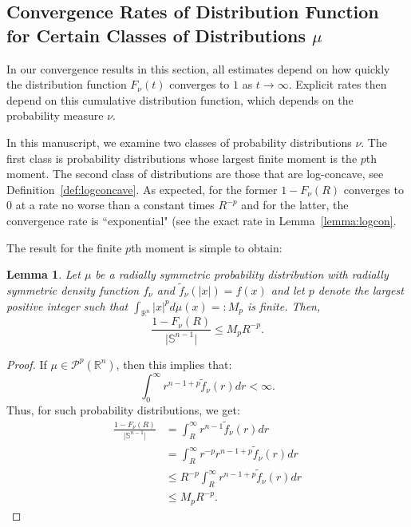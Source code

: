 \documentclass{amsart}
\theoremstyle{lemma}
\newtheorem{lemma}[theorem]{Lemma}
\theoremstyle{remark}
\begin{document}
\subsection{Convergence Rates of Distribution Function for Certain Classes of Distributions $\mu$}\label{sec:radialdistributions}

In our convergence results in this section, all estimates depend on how quickly the distribution function $F_{\nu}(t)$ converges to $1$ as $t \rightarrow \infty$. Explicit rates then depend on this cumulative distribution function, which depends on the probability measure $\nu$. 

In this manuscript, we examine two classes of probability distributions $\nu$. The first class is probability distributions whose largest finite moment is the $p$th moment. The second class of distributions are those that are log-concave, see Definition~\ref{def:logconcave}. As expected, for the former $1 - F_{\nu}(R)$ converges to $0$ at a rate no worse than a constant times $R^{-p}$ and for the latter, the convergence rate is ``exponential" (see the exact rate in Lemma~\ref{lemma:logcon}.

The result for the finite $p$th moment is simple to obtain:

\begin{lemma}\label{lemma:pmoment}
Let $\mu$ be a radially symmetric probability distribution with radially symmetric density function $f_{\nu}$ and $\tilde{f}_{\nu}(\vert x \vert) = f(x)$ and let $p$ denote the largest positive integer such that $\int_{\mathbb{R}^n} \vert x \vert^{p} d\mu(x) =: M_p$ is finite. Then,
\begin{equation}
\frac{1-F_{\nu}(R)}{\vert \mathbb{S}^{n-1} \vert} \leq M_p R^{-p}.
\end{equation}
\end{lemma}

\begin{proof}
If $\mu \in \mathcal{P}^{p}(\mathbb{R}^{n})$, then this implies that:
\begin{equation}
\int_{0}^{\infty} r^{n-1+p} \tilde{f}_{\nu}(r) dr < \infty.
\end{equation}
Thus, for such probability distributions, we get:
\begin{align}
\frac{1-F_{\nu}(R)}{\vert \mathbb{S}^{n-1} \vert} &= \int_{R}^{\infty} r^{n-1} \tilde{f}_{\nu}(r)dr \\
&= \int_{R}^{\infty} r^{-p} r^{n-1+p} \tilde{f}_{\nu}(r)dr \\
&\leq R^{-p} \int_{R}^{\infty} r^{n-1+p} \tilde{f}_{\nu}(r)dr \\
&\leq M_p R^{-p}.
\end{align}
\end{proof}
\end{document}
